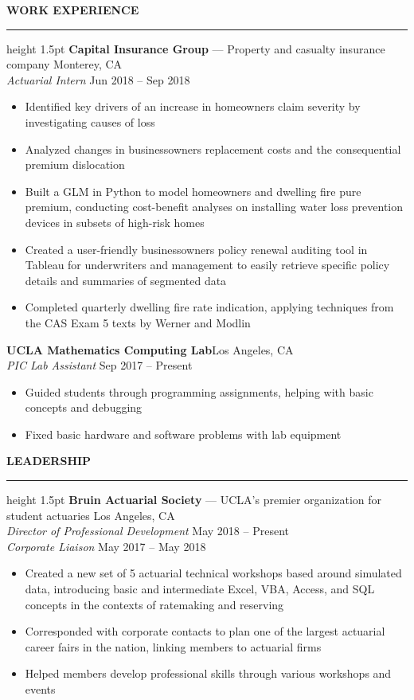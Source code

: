 \documentclass[11pt,letterpaper]{article}
\newcommand{\sectline}{\vspace{4pt}\hrule height 1.5pt\vspace{4pt}}
\newcommand{\sectspace}{\vspace{9pt}}
\begin{document}
\textbf{WORK EXPERIENCE}\sectline
\textbf{Capital Insurance Group} --- Property and casualty insurance company \hfill Monterey, CA \\
\textit{Actuarial Intern} \hfill Jun 2018 -- Sep 2018 
\begin{itemize}
	\item Identified key drivers of an increase in homeowners claim severity by investigating causes of loss
	\item Analyzed changes in businessowners replacement costs and the consequential premium dislocation
	\item Built a GLM in Python to model homeowners and dwelling fire pure premium, conducting cost-benefit analyses on installing water loss prevention devices in subsets of high-risk homes 
	\item Created a user-friendly businessowners policy renewal auditing tool in Tableau for underwriters and management to easily retrieve specific policy details and summaries of segmented data
	\item Completed quarterly dwelling fire rate indication, applying techniques from the CAS Exam 5 texts by Werner and Modlin
\end{itemize}
\textbf{UCLA Mathematics Computing Lab}\hfill Los Angeles, CA \\
\textit{PIC Lab Assistant} \hfill Sep 2017 -- Present %
\begin{itemize}
	\item Guided students through programming assignments, helping with basic concepts and debugging
	\item Fixed basic hardware and software problems with lab equipment
\end{itemize}
\sectspace


\textbf{LEADERSHIP} \sectline
\textbf{Bruin Actuarial Society} --- UCLA's premier organization for student actuaries \hfill Los Angeles, CA \\
\textit{Director of Professional Development} \hfill May 2018 -- Present \\
\textit{Corporate Liaison} \hfill May 2017 -- May 2018
\begin{itemize}
	\item Created a new set of 5 actuarial technical workshops based around simulated data, introducing basic and intermediate Excel, VBA, Access, and SQL concepts in the contexts of ratemaking and reserving
	\item Corresponded with corporate contacts to plan one of the largest actuarial career fairs in the nation, linking members to actuarial firms
	\item Helped members develop professional skills through various workshops and events
\end{itemize}
\sectspace
\end{document}
